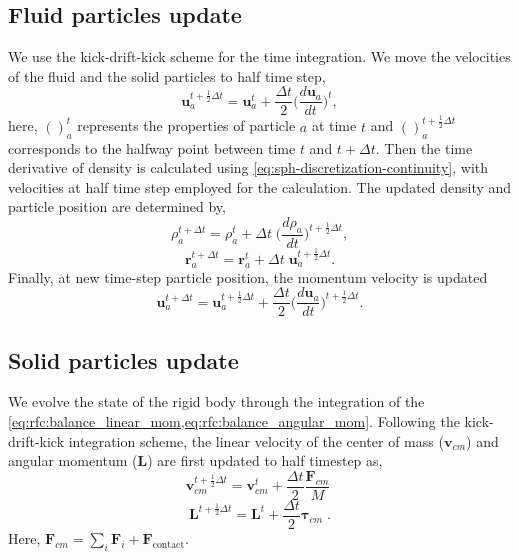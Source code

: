 \documentclass[preprint,12pt]{elsarticle}
\newcommand{\teng}[1]{\ensuremath{\boldsymbol{#1}}}
\newcommand{\ten}[1]{\ensuremath{\mathbf{#1}}}
\begin{document}
\subsection*{Fluid particles update}
We use the kick-drift-kick scheme \cite{monaghan-review:2005} for the time
integration. We move the velocities of the fluid and the solid particles to
half time step,
\begin{equation}
  \label{eq:velocity-update-stage-1}
  \ten{u}_a^{t+\frac{1}{2} \Delta t} = \ten{u}_a^{t} + \frac{\Delta t}{2} \bigg(\frac{d\ten{u}_{a}}{dt}\bigg)^t,
\end{equation}
here, $()_a^t$ represents the properties of particle $a$ at time $t$ and
$()_a^{t+\frac{1}{2} \Delta t}$ corresponds to the halfway point between time
$t$ and $t + \Delta t$. Then the time derivative of density is calculated using
\cref{eq:sph-discretization-continuity}, with velocities at half time step
employed for the calculation.  The updated density and particle position
are determined by,
\begin{equation}
  \label{eq:density-update-stage-2}
  \rho_{a}^{t+\Delta t} = \rho_{a}^{t} + \Delta t \; \bigg(\frac{d\rho_{a}}{dt}\bigg)^{t+\frac{1}{2} \Delta t},
\end{equation}
\begin{equation}
  \label{eq:position-update-stage-2}
  \ten{r}_{a}^{t+\Delta t} = \ten{r}_{a}^{t} + \Delta t \; \ten{u}_{a}^{t+\frac{1}{2}\Delta t}.
\end{equation}
%
Finally, at new time-step particle position, the momentum velocity is updated
\begin{equation}
  \label{eq:velocity-update-stage-3}
  \ten{u}_a^{t+\Delta t} = \ten{u}_a^{t+\frac{1}{2}\Delta t} + \frac{\Delta t}{2} \bigg(\frac{d\ten{u}_{a}}{dt}\bigg)^{t+\frac{1}{2}\Delta t}.
\end{equation}


\subsection*{Solid particles update}
We evolve the state of the rigid body through the integration of the
\cref{eq:rfc:balance_linear_mom,eq:rfc:balance_angular_mom}. Following the
kick-drift-kick integration scheme, the linear velocity of the center of mass
($\ten{v}_{cm}$) and angular momentum ($\ten{L}$) are first updated to half
timestep as,
\begin{equation}
  \label{eq:rfc:lin_vel_cm_update}
  \ten{v}_{cm}^{t+\frac{1}{2} \Delta t} = \ten{v}_{cm}^{t} + \frac{\Delta t}{2} \frac{\ten{F}_{cm}}{M} \;
\end{equation}
\begin{equation}
  \label{eq:rfc:ang_mom_update}
  \ten{L}^{t+\frac{1}{2} \Delta t} = \ten{L}^{t} + \frac{\Delta t}{2} \teng{\tau}_{cm} \;.
\end{equation}
Here, $\ten{F}_{cm} = \sum_i \ten{F}_i + \ten{F}_{\text{contact}}$.
\end{document}
